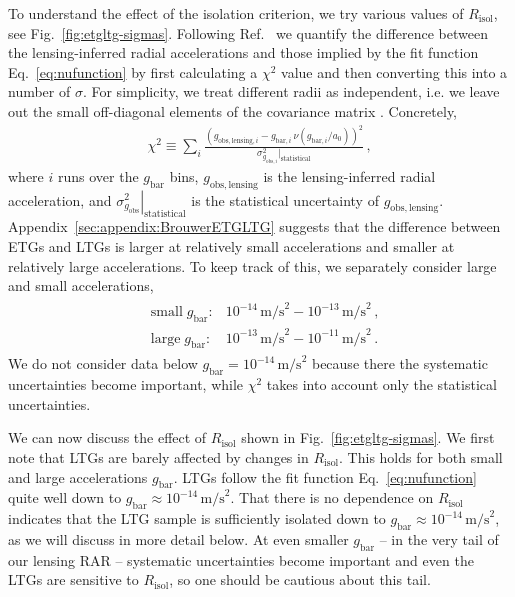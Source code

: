 \documentclass[a4paper,11pt]{article}
\begin{document}
To understand the effect of the isolation criterion, we try various values of $R_{\mathrm{isol}}$, see Fig.~\ref{fig:etgltg-sigmas}.
Following Ref.~\cite{Brouwer2021} we quantify the difference between the lensing-inferred radial accelerations and those implied by the fit function Eq.~\eqref{eq:nufunction} by first calculating a $\chi^2$ value and then converting this into a number of $\sigma$.
For simplicity, we treat different radii as independent, i.e. we leave out the small off-diagonal elements of the covariance matrix \citep{Brouwer2021}.
Concretely,
\begin{align}
 \label{eq:chi2}
 \chi^2 \equiv \sum_i \frac{
   (g_{\mathrm{obs},\mathrm{lensing},i} - g_{\mathrm{bar},i} \, \nu(g_{\mathrm{bar},i}/a_0))^2
  }{
    \sigma^2_{g_{\mathrm{obs},i}}|_{\mathrm{statistical}}
  } \,,
\end{align}
where $i$ runs over the $g_{\mathrm{bar}}$ bins, $g_{\mathrm{obs},\mathrm{lensing}}$ is the lensing-inferred radial acceleration, and $\left.\sigma^2_{g_{\mathrm{obs}}}\right|_{\mathrm{statistical}}$ is the statistical uncertainty of $g_{\mathrm{obs},\mathrm{lensing}}$.
Appendix~\ref{sec:appendix:BrouwerETGLTG} suggests that the difference between ETGs and LTGs is larger at relatively small accelerations and smaller at relatively large accelerations.
To keep track of this, we separately consider large and small accelerations,
\begin{align}
\label{eq:defsmalllargegbar}
\begin{aligned}
 &\mathrm{small}\;g_{\mathrm{bar}}: &10^{-14}\,\mathrm{m/s}^2 - 10^{-13}\,\mathrm{m/s}^2 \,, \\
 &\mathrm{large}\;g_{\mathrm{bar}}: &10^{-13}\,\mathrm{m/s}^2 - 10^{-11}\,\mathrm{m/s}^2 \,.
\end{aligned}
\end{align}
We do not consider data below $g_{\mathrm{bar}} = 10^{-14}\,\mathrm{m/s}^2$ because there the systematic uncertainties become important, while $\chi^2$ takes into account only the statistical uncertainties.

We can now discuss the effect of $R_{\mathrm{isol}}$ shown in Fig.~\ref{fig:etgltg-sigmas}.
We first note that LTGs are barely affected by changes in $R_{\mathrm{isol}}$.
This holds for both small and large accelerations $g_{\mathrm{bar}}$.
LTGs follow the fit function Eq.~\eqref{eq:nufunction} quite well down to $g_{\mathrm{bar}} \approx 10^{-14}\,\mathrm{m/s}^2$.
That there is no dependence on $R_{\mathrm{isol}}$ indicates that the LTG sample is sufficiently isolated down to $g_{\mathrm{bar}} \approx 10^{-14}\,\mathrm{m/s}^2$, as we will discuss in more detail below.
At even smaller $g_{\mathrm{bar}}$ -- in the very tail of our lensing RAR -- systematic uncertainties become important and even the LTGs are sensitive to $R_{\mathrm{isol}}$, so one should be cautious about this tail.
\end{document}
